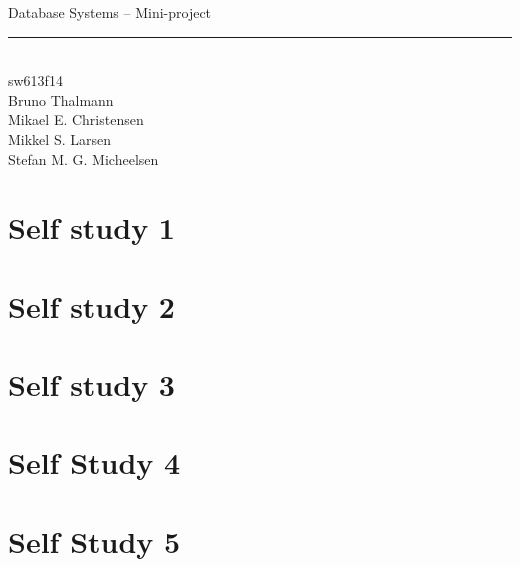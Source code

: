 
\newcommand{\HRule}{\rule{\linewidth}{0.5mm}}


\begin{titlepage}
\centering
{\LARGE Database Systems -- Mini-project}
\HRule \\[0.5cm]
{\Large sw613f14} \\[0.5cm]
Bruno Thalmann\\
Mikael E. Christensen\\
Mikkel S. Larsen\\
Stefan M. G. Micheelsen
\end{titlepage}

\chapter{Self study 1}


\chapter{Self study 2}


\chapter{Self study 3}


\chapter{Self Study 4}


\chapter{Self Study 5}



